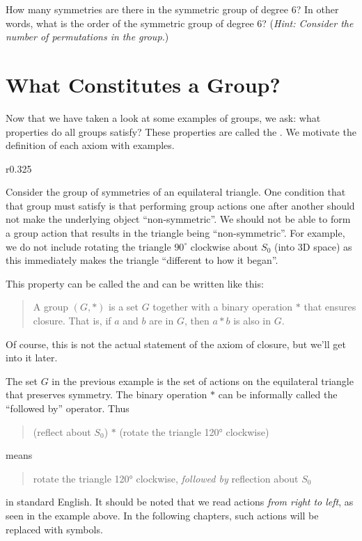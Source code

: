\begin{exercise}
    How many symmetries are there in the symmetric group of degree 6? In other words, what is the order of the symmetric group of degree 6?\newline
    (\textit{Hint: Consider the number of permutations in the group.})
\end{exercise}

\section{What Constitutes a Group?}
Now that we have taken a look at some examples of groups, we ask: what properties do all groups satisfy? These properties are called the . We motivate the definition of each axiom with examples.

\begin{wrapfigure}{r}{0.325\textwidth}
    \centering
\end{wrapfigure}

Consider the group of symmetries of an equilateral triangle. One condition that that group must satisfy is that performing group actions one after another should not make the underlying object ``non-symmetric''. We should not be able to form a group action that results in the triangle being ``non-symmetric''. For example, we do not include rotating the triangle $90^\circ$ clockwise about $S_0$ (into 3D space) as this immediately makes the triangle ``different to how it began''.

\newpage

This property can be called the  and can be written like this:
\begin{quote}
    A group $(G, \ast)$ is a set $G$ together with a binary operation $\ast$ that ensures closure. That is, if $a$ and $b$ are in $G$, then $a \ast b$ is also in $G$.
\end{quote}
Of course, this is not the actual statement of the axiom of closure, but we'll get into it later.

The set $G$ in the previous example is the set of actions on the equilateral triangle that preserves symmetry. The binary operation $\ast$ can be informally called the ``followed by'' operator. Thus
\begin{quote}
    (reflect about $S_0$) $\ast$ (rotate the triangle 120° clockwise)
\end{quote}
means
\begin{quote}
    rotate the triangle 120° clockwise, \textit{followed by} reflection about $S_0$
\end{quote}
in standard English. It should be noted that we read actions \textit{from right to left}, as seen in the example above. In the following chapters, such actions will be replaced with symbols.

